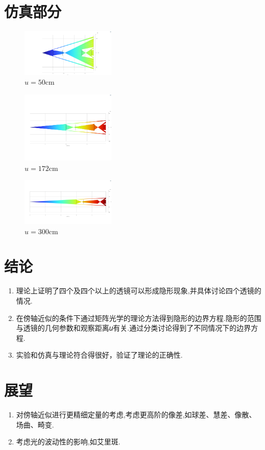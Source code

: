 \documentclass[UTF8]{gapd}
\begin{document}
\section{仿真部分}
\begin{figure}[htbp]
  \centering
  \includegraphics[width=0.4\textwidth]{images/27.png}
  \caption{$u=50\mathrm{cm} $}
\end{figure}
\begin{figure}[htbp]
  \centering
  \includegraphics[width=0.4\textwidth]{images/28.png}
  \caption{$u=172\mathrm{cm} $}
\end{figure}
\begin{figure}[htbp]
  \centering
  \includegraphics[width=0.4\textwidth]{images/29.png}
  \caption{$u=300\mathrm{cm} $}
\end{figure}
\section{结论}
\begin{enumerate}
  \item 理论上证明了四个及四个以上的透镜可以形成隐形现象,并具体讨论四个透镜的情况.
  \item 在傍轴近似的条件下通过矩阵光学的理论方法得到隐形的边界方程.隐形的范围与透镜的几何参数和观察距离𝑢有关.通过分类讨论得到了不同情况下的边界方程.
  \item 实验和仿真与理论符合得很好，验证了理论的正确性.
\end{enumerate}
\section{展望}
\begin{enumerate}
  \item 对傍轴近似进行更精细定量的考虑,考虑更高阶的像差,如球差、慧差、像散、场曲、畸变.
  \item 考虑光的波动性的影响,如艾里斑.
\end{enumerate}
\end{document}

